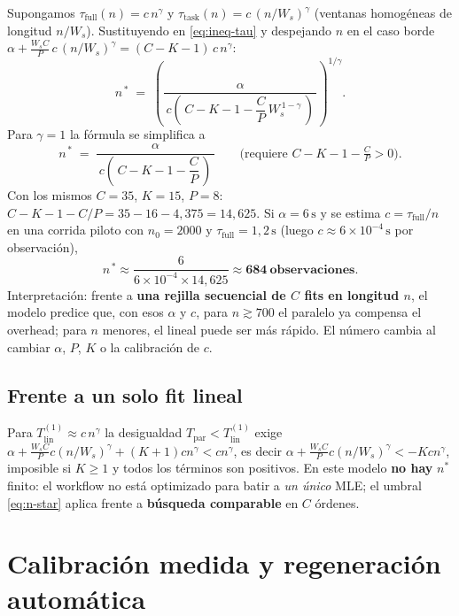 \documentclass[11pt,a4paper]{article}
\begin{document}
Supongamos $\tau_{\mathrm{full}}(n)=c\,n^\gamma$ y
$\tau_{\mathrm{task}}(n)=c\,(n/W_s)^\gamma$ (ventanas homogéneas de longitud
$n/W_s$). Sustituyendo en \eqref{eq:ineq-tau} y despejando $n$ en el caso borde
$\alpha + \frac{W_s C}{P}\, c\,(n/W_s)^\gamma = (C-K-1)\, c\, n^\gamma$:
\begin{equation}
  \label{eq:n-star}
  \boxed{
  n^{\,*}
  \;=\;
  \left(
  \frac{\alpha}
       {\,c\left(\, C - K - 1 - \dfrac{C}{P}\, W_s^{\,1-\gamma}\,\right)\,}
  \right)^{\!1/\gamma}
  }.
\end{equation}
Para $\gamma=1$ la fórmula se simplifica a
\begin{equation}
  \label{eq:n-star-gamma1}
  n^{\,*}
  \;=\;
  \frac{\alpha}
       {\,c\left(\, C - K - 1 - \dfrac{C}{P}\,\right)\,}
  \qquad\text{(requiere } C - K - 1 - \tfrac{C}{P} > 0\text{)}.
\end{equation}
Con los mismos $C=35$, $K=15$, $P=8$: $C-K-1-C/P = 35-16-4{,}375 = 14{,}625$.
Si $\alpha=6\,\mathrm{s}$ y se estima $c = \tau_{\mathrm{full}}/n$ en una corrida
piloto con $n_0=2000$ y $\tau_{\mathrm{full}}=1{,}2\,\mathrm{s}$ (luego
$c \approx 6\times 10^{-4}\,\mathrm{s}$ por observación),
\[
  n^{\,*}
  \approx \frac{6}{6\times 10^{-4} \times 14{,}625}
  \approx \mathbf{684\ \text{observaciones}}.
\]
Interpretación: frente a \textbf{una rejilla secuencial de $C$ fits en longitud
$n$}, el modelo predice que, con esos $\alpha$ y $c$, para $n \gtrsim 700$ el
paralelo ya compensa el overhead; para $n$ menores, el lineal puede ser más
rápido. El número cambia al cambiar $\alpha$, $P$, $K$ o la calibración de $c$.

\subsection{Frente a un solo fit lineal}

Para $T_{\mathrm{lin}}^{(1)} \approx c\,n^\gamma$ la desigualdad
$T_{\mathrm{par}} < T_{\mathrm{lin}}^{(1)}$ exige
$\alpha + \frac{W_s C}{P} c (n/W_s)^\gamma + (K+1) c n^\gamma < c n^\gamma$,
es decir $\alpha + \frac{W_s C}{P} c (n/W_s)^\gamma < -K c n^\gamma$, imposible
si $K\ge 1$ y todos los términos son positivos. En este modelo \textbf{no hay}
$n^{*}$ finito: el workflow no está optimizado para batir a \emph{un único} MLE;
el umbral \eqref{eq:n-star} aplica frente a \textbf{búsqueda comparable} en $C$
órdenes.

\section{Calibración medida y regeneración automática}
\label{sec:calibration}
\end{document}
